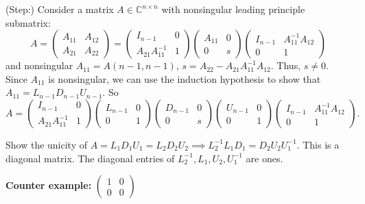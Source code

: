 \documentclass[a4paper, landscape,twocolumn,fontsize=9pt]{scrartcl}
\begin{document}
\begin{enumerate}
    (Step:) Consider a matrix $A \in \mathbb C^{n \times n}$ with nonsingular leading principle submatrix:
    \[
    	A = \begin{pmatrix}
    		A_{11} & A_{12} \\ A_{21} & A_{22}
    	\end{pmatrix} = 
    	\begin{pmatrix}
    		I_{n-1} & 0 \\ A_{21}A_{11}^{-1} & 1
    	\end{pmatrix}
    	\begin{pmatrix}
    		A_{11} & 0 \\ 0 & s
    	\end{pmatrix}
    	\begin{pmatrix}
    		I_{n-1} & A_{11}^{-1}A_{12} \\ 0 & 1
    	\end{pmatrix}
    \]
    and nonsingular $A_{11} = A(n-1,n-1)$, $s = A_{22} - A_{21}A_{11}^{-1}A_{12}$. Thus, $s \neq 0$. Since $A_{11}$ is nonsingular, we can use the induction hypothesis to show that $A_{11} = L_{n-1}D_{n-1}U_{n-1}$. So
        \[
    	A = 
    	\begin{pmatrix}
    		I_{n-1} & 0 \\ A_{21}A_{11}^{-1} & 1
    	\end{pmatrix}
    	\begin{pmatrix}
    		L_{n-1} & 0 \\ 0 & 1
    	\end{pmatrix}
    	\begin{pmatrix}
    		D_{n-1} & 0 \\ 0 & s
    	\end{pmatrix}
    	\begin{pmatrix}
    		U_{n-1} & 0 \\ 0 & 1
    	\end{pmatrix}
    	\begin{pmatrix}
    		I_{n-1} & A_{11}^{-1}A_{12} \\ 0 & 1
    	\end{pmatrix}.
    \]
    
    Show the unicity of $A=L_1D_1U_1 = L_2D_2U_2 \implies L_2^{-1}L_1D_1 = D_2U_2U_1^{-1}$. This is a diagonal matrix. The diagonal entries of $L_2^{-1}, L_1, U_2, U_1^{-1}$ are ones.
    
    \textbf{Counter example:} $\begin{pmatrix}
    	1 & 0 \\ 0 & 0
    \end{pmatrix}$
    

\end{enumerate}
\end{document}
